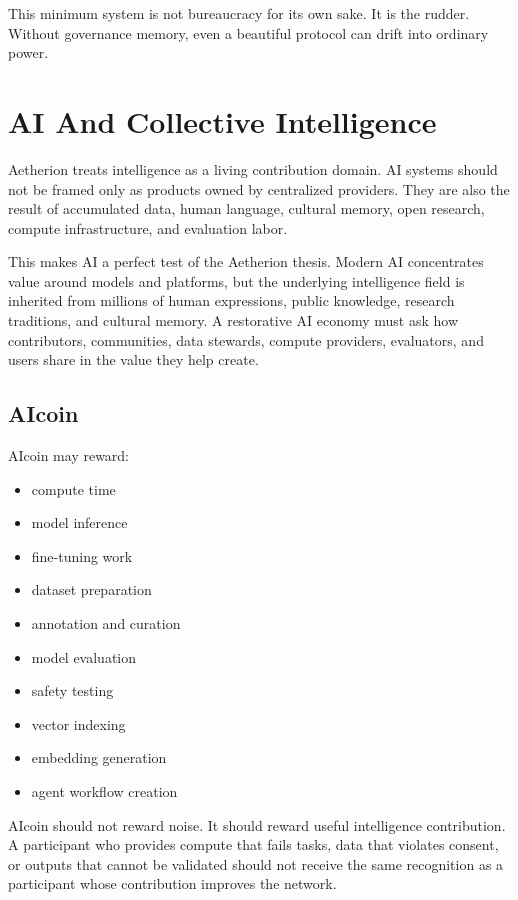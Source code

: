 \documentclass[12pt]{article}
\begin{document}
This minimum system is not bureaucracy for its own sake. It is the rudder. Without governance memory, even a beautiful protocol can drift into ordinary power.

\section{AI And Collective Intelligence}

Aetherion treats intelligence as a living contribution domain. AI systems should not be framed only as products owned by centralized providers. They are also the result of accumulated data, human language, cultural memory, open research, compute infrastructure, and evaluation labor.

This makes AI a perfect test of the Aetherion thesis. Modern AI concentrates value around models and platforms, but the underlying intelligence field is inherited from millions of human expressions, public knowledge, research traditions, and cultural memory. A restorative AI economy must ask how contributors, communities, data stewards, compute providers, evaluators, and users share in the value they help create.

\subsection{AIcoin}

AIcoin may reward:

\begin{itemize}
  \item compute time
  \item model inference
  \item fine-tuning work
  \item dataset preparation
  \item annotation and curation
  \item model evaluation
  \item safety testing
  \item vector indexing
  \item embedding generation
  \item agent workflow creation
\end{itemize}

AIcoin should not reward noise. It should reward useful intelligence contribution. A participant who provides compute that fails tasks, data that violates consent, or outputs that cannot be validated should not receive the same recognition as a participant whose contribution improves the network.
\end{document}
